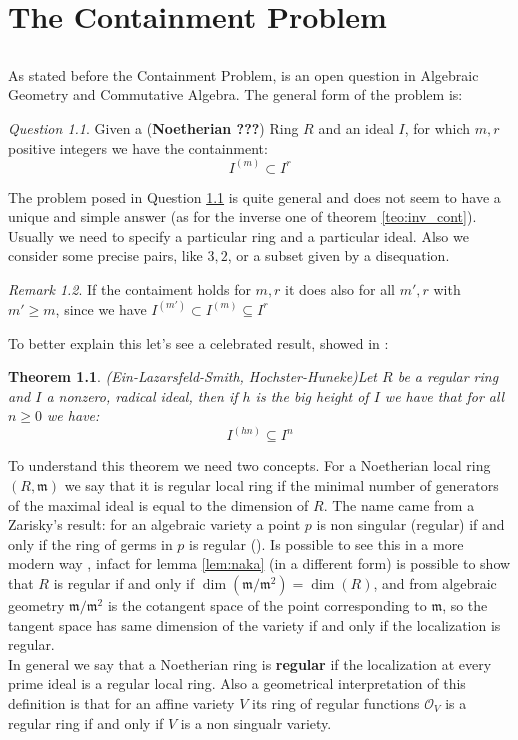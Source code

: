 \documentclass[]{book}
\theoremstyle{plain}
\newtheorem{teo}{Theorem}[section]
\theoremstyle{remark}
\newtheorem{rem}{Remark}
\newtheorem{que}[rem]{Question}
\theoremstyle{definition}
\newcommand{\mm}{\mathfrak{m}}
\newcommand{\cont}[2]{ I^{(#1)} \subseteq I^{#2}}
\begin{document}
\chapter{The Containment Problem}
	\section*{}
	As stated before the Containment Problem, is an open question in Algebraic Geometry and Commutative Algebra. The general form of the problem is:
	\begin{que} \label{que:cont}
		Given a (\textbf{Noetherian ???}) Ring $ R $ and an ideal $ I $, for which $ m,r $ positive integers we have the containment:
		$$ I^{(m)} \subset I^r $$
	\end{que}
	The problem posed in Question \ref{que:cont} is quite general and does not seem to have a unique and simple answer (as for the inverse one of theorem \ref{teo:inv_cont}). Usually we need to specify a particular ring and a particular ideal. Also we consider some precise pairs, like $ 3,2 $, or a subset given by a disequation. 
	\begin{rem}
	If the contaiment holds for $ m,r $ it does also for all $ m' ,r $ with $ m'\geq m $, since we have $ I^{(m')} \subset \cont{m}{r} $
	\end{rem}
	To better explain this let's see a celebrated result, showed in \cite{HocHun02,EinLazSmi01}:
	\begin{teo}{(Ein-Lazarsfeld-Smith, Hochster-Huneke)}\label{teo:cont:bigh}
	Let $ R $ be a regular ring and $ I $ a nonzero, radical ideal, then if $ h $ is the big height of $ I $ we have that for all $ n \geq 0 $ we have:
	\[ \cont{hn}{n}\]	
	\end{teo} 
	
	To understand this theorem we need two concepts.
	For a Noetherian local ring $ (R,\mm) $ we say that it is regular local ring if the minimal number of generators of the maximal ideal is equal to the dimension of $ R $. The name came from a Zarisky's result: for an algebraic variety a point $ p $ is non singular (regular) if and only if the ring of germs in $ p $ is regular (\cite{Zar40}). Is possible to see this in a more modern way , infact for lemma \ref{lem:naka} (in a different form) is possible to show that $ R $ is regular if and only if $ \dim(\mm / \mm^2 ) = \dim (R) $, and from algebraic geometry $ \mm /\mm^2 $ is the cotangent space of the point corresponding to $ \mm $, so the tangent space has same dimension of the variety if and only if the localization is regular.\\
	In general we say that a Noetherian ring is \textbf{regular} if the localization at every prime ideal is a regular local ring. Also a geometrical interpretation of this definition is that for an affine variety $ V $ its ring of regular functions $ \mathcal{O}_V $ is a regular ring if and only if $ V $ is a non singualr variety. 
	
\end{document}
